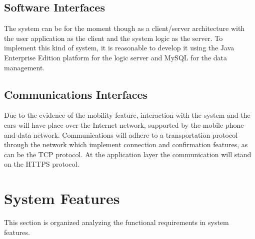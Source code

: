 \documentclass{scrreprt}
\begin{document}
\section{Software Interfaces}
The system can be for the moment though as a client/server architecture with the user application as the client and the system logic as the server.
To implement this kind of system, it is reasonable to develop it using the Java Enterprise Edition platform for the logic server and MySQL for the data management.
\begin{comment}$<$Describe the connections between this product and other specific software 
components (name and version), including databases, operating systems, tools, 
libraries, and integrated commercial components. Identify the data items or 
messages coming into the system and going out and describe the purpose of each.  
Describe the services needed and the nature of communications. Refer to 
documents that describe detailed application programming interface protocols.  
Identify data that will be shared across software components. If the data 
sharing mechanism must be implemented in a specific way (for example, use of a 
global data area in a multitasking operating system), specify this as an 
implementation constraint.$>$
\end{comment}

\section{Communications Interfaces}
Due to the evidence of the mobility feature, interaction with the system and the cars will have place over the Internet network, supported by the mobile phone-and-data network.
Communications will adhere to a transportation protocol through the network which implement connection and confirmation features, as can be the TCP protocol.
At the application layer the communication will stand on the HTTPS protocol.
\begin{comment}$<$Describe the requirements associated with any communications functions 
required by this product, including e-mail, web browser, network server 
communications protocols, electronic forms, and so on. Define any pertinent 
message formatting. Identify any communication standards that will be used, such 
as FTP or HTTP. Specify any communication security or encryption issues, data 
transfer rates, and synchronization mechanisms.$>$
\end{comment}


\chapter{System Features}
This section is organized analyzing the functional requirements in system features.
\begin{comment}$<$This template illustrates organizing the functional requirements for the 
product by system features, the major services provided by the product. You may 
prefer to organize this section by use case, mode of operation, user class, 
object class, functional hierarchy, or combinations of these, whatever makes the 
most logical sense for your product.$>$
\end{comment}
\end{document}

